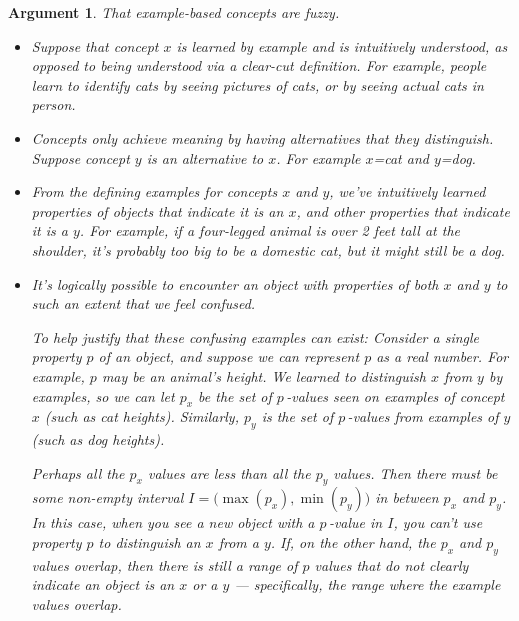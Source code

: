 \documentclass[11pt, oneside]{article}
\newtheorem*{argt}{Argument}
\begin{document}
\begin{argt} That example-based concepts are fuzzy.
    \label{a5}
    \normalfont
    \begin{itemize}
        \item Suppose that concept $x$ is learned by example and is
            intuitively understood, as opposed to being understood via
            a clear-cut definition.
            For
            example, people learn to identify {\em cats}
            by seeing pictures of cats, 
            or by seeing actual cats in person.
        \item Concepts only achieve meaning by having alternatives that they
            distinguish. Suppose concept $y$ is an alternative to $x$.
            For example $x$={\em cat} and $y$={\em dog}.
        \item From the defining examples for concepts $x$ and $y$, we've
            intuitively learned properties of objects
            that indicate it is an $x$, and other properties that indicate it is
            a $y$. For example, if a four-legged animal is over 2 feet tall at
            the
            shoulder, it's probably too big to be a domestic cat, but it might
            still be a dog.
        \item It's logically possible to encounter an object with properties of
            both $x$ and $y$ to such an extent that we feel confused.

            To help justify that these confusing examples can exist:
            Consider a single property $p$
            of an object, and suppose we can represent $p$ as a real number. For
            example, $p$ may be an animal's height. We learned to
            distinguish $x$ from $y$ by examples, so we can let $p_x$ be the set
            of $p$\,-values seen on examples of concept $x$ (such as cat
            heights).  Similarly, $p_y$
            is the set of $p$\,-values from examples of $y$ (such as dog
            heights).

            Perhaps all the $p_x$ values are less than all the $p_y$ values.
            Then there must be some non-empty interval
            $I=\big(\!\max(p_x), \min(p_y)\big)$ in between $p_x$ and $p_y$.
            In this case, when you see a new object with a $p$\,-value in $I$,
            you can't use property $p$ to distinguish an $x$ from a $y$.
            If, on the other hand, the $p_x$ and $p_y$ values overlap, then
            there is still a range of $p$ values
            that do not clearly indicate an object is an $x$ or a $y$ ---
            specifically, the range where the example values overlap.


\end{itemize}
\end{argt}
\end{document}
